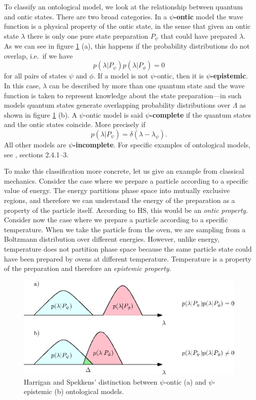 \documentclass[10pt,twocolumn, nofootinbib]{revtex4-2}
\begin{document}
To classify an ontological model, we look at the relationship between quantum and ontic states. There are two broad categories. In a \textbf{$\psi$-ontic} model the wave function is a physical property of the ontic state, in the sense that given an ontic state $\lambda$ there is only one pure state preparation $P_\psi$ that could have prepared $\lambda$. As we can see in figure \ref{overlap} (a), this happens if the probability distributions do not overlap, i.e.\ if we have
\begin{equation}\label{ontic_condition}
	p(\lambda | P_{\psi})p(\lambda|P_{\phi})=0
\end{equation}
for all pairs of states $\psi$ and $\phi$. If a model is not $\psi$-ontic, then it is \textbf{$\psi$-epistemic}. In this case, $\lambda$ can be described by more than one quantum state and the wave function is taken to represent knowledge about the state preparation---in such models quantum states generate overlapping probability distributions over $\Lambda$ as shown in figure \ref{overlap} (b). A $\psi$-ontic model is said \textbf{$\psi$-complete} if the quantum states and the ontic states coincide. More precisely if 
\begin{equation}\label{complete_condition}
	p(\lambda|P_\psi)=\delta(\lambda-\lambda_{\psi}).
\end{equation}
All other models are \textbf{$\psi$-incomplete}. For specific examples of ontological models, see \cite{Harrigan:2010}, sections 2.4.1--3.


To make this classification more concrete, let us give an example from classical mechanics. Consider the case where we prepare a particle according to a specific value of energy. The energy partitions phase space into mutually exclusive regions, and therefore we can understand the energy of the preparation as a property of the particle itself. According to HS, this would be an \emph{ontic property}. Consider now the case where we prepare a particle according to a specific temperature. When we take the particle from the oven, we are sampling from a Boltzmann distribution over different energies. However, unlike energy, temperature does not partition phase space because the same particle state could have been prepared by ovens at different temperature. Temperature is a property of the preparation and therefore an \emph{epistemic property}. 

\begin{figure}
\includegraphics[scale=.7]{ontic}
\caption{\footnotesize{Harrigan and Spekkens' distinction between $\psi$-ontic (a) and $\psi$-epistemic (b) ontological models.}}\label{overlap}
\end{figure}
\end{document}
